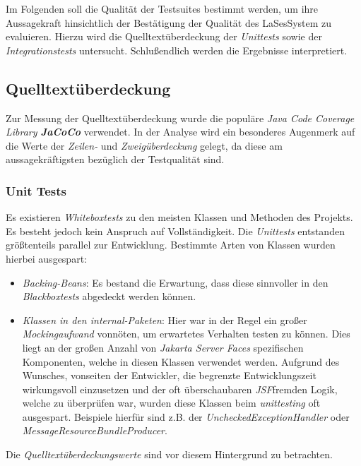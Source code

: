
Im Folgenden soll die Qualität der Testsuites bestimmt werden,
um ihre Aussagekraft hinsichtlich der Bestätigung der Qualität des LaSes\-System zu evaluieren.
Hierzu wird die Quelltextüberdeckung der \emph{Unittests} sowie der \emph{Integrationstests} untersucht.
Schlußendlich werden die Ergebnisse interpretiert.

\subsection{Quelltextüberdeckung}\label{subsec:quelltextueberdeckung}
Zur Messung der Quelltextüberdeckung wurde die populäre \emph{Java Code Coverage Library \textbf{JaCoCo}} verwendet.
In der Analyse wird ein besonderes Augenmerk auf die Werte der \emph{Zeilen-} und \emph{Zweigüberdeckung} gelegt,
da diese am aussagekräftigsten bezüglich der Testqualität sind.

\subsubsection{Unit Tests}
Es existieren \emph{Whiteboxtests} zu den meisten Klassen und Methoden des Projekts.
Es besteht jedoch kein Anspruch auf Vollständigkeit.
Die \emph{Unittests} entstanden größtenteils parallel zur Entwicklung.
Bestimmte Arten von Klassen wurden hierbei ausgespart:

\begin{itemize}
    \item \emph{Backing-Beans}: Es bestand die Erwartung, dass diese sinnvoller in den \emph{Blackboxtests}
    abgedeckt werden können.
    \item \emph{Klassen in den internal-Paketen}: Hier war in der Regel ein großer \emph{Mockingaufwand} vonnöten,
    um erwartetes Verhalten testen zu können.
    Dies liegt an der großen Anzahl von \emph{Jakarta Server Faces} spezifischen Komponenten,
    welche in diesen Klassen verwendet werden.
    Aufgrund des Wunsches, vonseiten der Entwickler, die begrenzte Entwicklungszeit
    wirkungsvoll einzusetzen und der oft überschaubaren \emph{JSF}\-fremden Logik, welche zu überprüfen war,
    wurden diese Klassen beim \emph{unittesting} oft ausgespart.
    Beispiele hierfür sind z.B. der \emph{UncheckedExceptionHandler} oder \emph{MessageResourceBundleProducer}.
\end{itemize}
Die \emph{Quelltextüberdeckungswerte} sind vor diesem Hintergrund zu betrachten.

